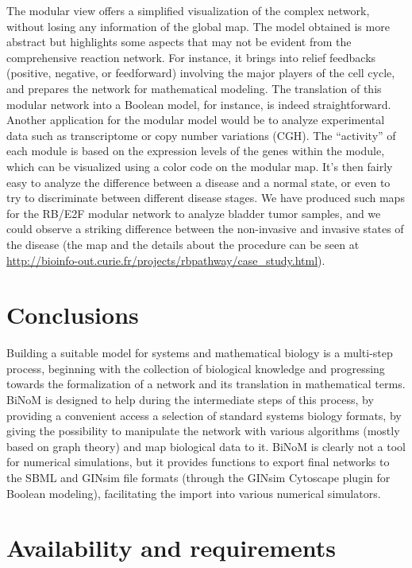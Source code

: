 \documentclass[11pt]{bmc_article_s50}
\newenvironment{bmcformat}{\begin{raggedright}\baselineskip20pt\sloppy\setboolean{publ}{false}}{\end{raggedright}\baselineskip20pt\sloppy}
\begin{document}
\begin{bmcformat}
The modular view offers a simplified visualization of the complex network,
without losing any information of the global map. The
 model obtained is more abstract but highlights some aspects that may not be
evident from the comprehensive reaction network. For instance, it brings into
relief feedbacks (positive, negative, or feedforward) involving the major players of the
cell cycle, and prepares the network for mathematical modeling. The translation
of this modular network into a Boolean model, for instance, is indeed straightforward. Another
application for the modular model would be to analyze experimental data such as
transcriptome or copy number variations (CGH). The ``activity'' of each module
is based on the expression levels of the genes within the module,
which can be visualized using a color code on the modular map. It's then fairly easy to analyze
the difference between a disease and a normal state, or even to try to
discriminate between different disease stages. We have produced such maps for the
RB/E2F modular network to analyze bladder tumor samples, and we could observe a
striking difference between the non-invasive and invasive states of the disease
\cite{calzone2008comprehensive} (the map and the details about the procedure can be seen at
\url{http://bioinfo-out.curie.fr/projects/rbpathway/case_study.html}).

\section*{Conclusions}

Building a suitable model for systems and mathematical biology is a multi-step
process, beginning with the collection of biological knowledge and progressing
towards the formalization of a network and its translation in mathematical
terms. BiNoM is designed to help during the intermediate steps of this process,
by providing a convenient access a selection of standard systems biology
formats, by giving the possibility to manipulate the
network with various algorithms (mostly based on graph theory)
and map biological data to it. BiNoM is clearly not a tool for numerical
simulations, but it provides functions to export final networks to the SBML and
GINsim file formats (through the GINsim Cytoscape plugin for Boolean modeling), facilitating the
import into various numerical simulators.

\section*{Availability and requirements}


\end{bmcformat}
\end{document}
